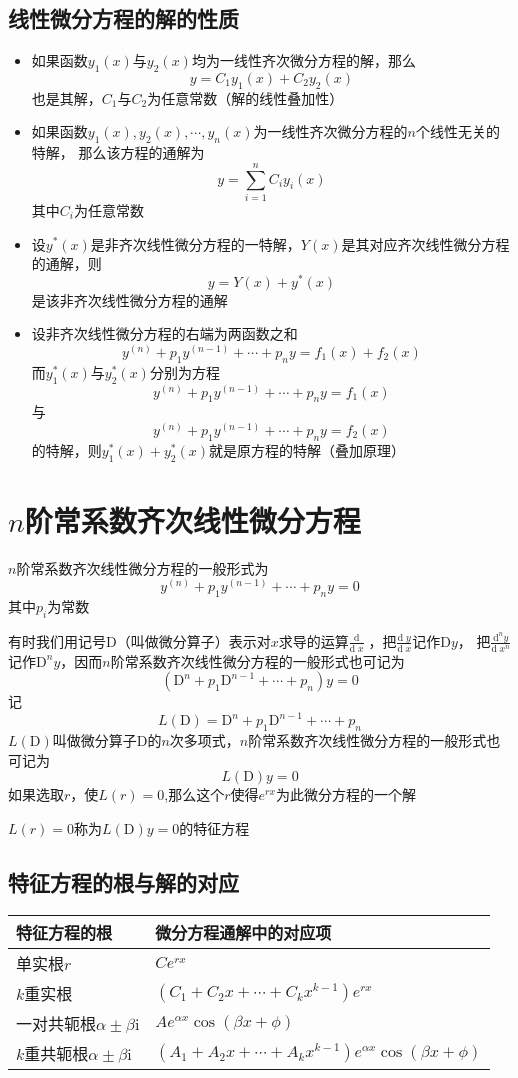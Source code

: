\documentclass[UTF8]{ctexart}
\newcommand{\dif}[1]{\text{d}\;\!#1}
\newcommand{\dev}[1]{\frac{\text{d}}{\dif{#1}}\;\!}
\begin{document}
\subsection*{线性微分方程的解的性质}
\begin{itemize}
  \item 如果函数$y_1(x)$与$y_2(x)$均为一线性齐次微分方程的解，那么
  \[y=C_1y_1(x)+C_2y_2(x)\]
  也是其解，$C_1$与$C_2$为任意常数（解的线性叠加性）

  \item 如果函数$y_1(x),y_2(x),\cdots,y_n(x)$为一线性齐次微分方程的$n$个线性无关的特解，
  那么该方程的通解为
  \[y=\sum^n_{i=1}C_iy_i(x)\]
  其中$C_i$为任意常数

  \item 设$y^*(x)$是非齐次线性微分方程的一特解，$Y(x)$是其对应齐次线性微分方程的通解，则
  \[ y=Y(x)+y^*(x) \]
  是该非齐次线性微分方程的通解

  \item 设非齐次线性微分方程的右端为两函数之和
  \[y^{(n)}+p_1y^{(n-1)}+\cdots+p_ny=f_1(x)+f_2(x)\]
  而$y_1^*(x)$与$y_2^*(x)$分别为方程
  \[ y^{(n)}+p_1y^{(n-1)}+\cdots+p_ny=f_1(x) \]
  与
  \[ y^{(n)}+p_1y^{(n-1)}+\cdots+p_ny=f_2(x) \]
  的特解，则$y_1^*(x)+y_2^*(x)$就是原方程的特解（叠加原理）
\end{itemize}

\bigskip
\bigskip

\section*{$n$阶常系数齐次线性微分方程}

$n$阶常系数齐次线性微分方程的一般形式为
\[y^{(n)}+p_1y^{(n-1)}+\cdots+p_ny=0\]
其中$p_i$为常数

有时我们用记号$\text{D}$（叫做微分算子）表示对$x$求导的运算$\dev{x}$，把$\frac{\dif{y}}{\dif{x}}$记作$\text{D}y$，
把$\frac{\text{d}^ny}{\dif{x}^n}$记作$\text{D}^ny$，因而$n$阶常系数齐次线性微分方程的一般形式也可记为
\[(\text{D}^n+p_1\text{D}^{n-1}+\cdots+p_n)y=0\]
记
\[L(\text{D})=\text{D}^n+p_1\text{D}^{n-1}+\cdots+p_n\]
$L(\text{D})$叫做微分算子$\text{D}$的$n$次多项式，$n$阶常系数齐次线性微分方程的一般形式也可记为
\[L(\text{D})y=0\]
如果选取$r$，使$L(r)=0$,那么这个$r$使得$e^{rx}$为此微分方程的一个解

$L(r)=0$称为$L(\text{D})y=0$的特征方程

\subsection*{特征方程的根与解的对应}
\begin{center}
  \begin{tabular}{ll}
    特征方程的根&微分方程通解中的对应项\\
    \hline
    单实根$r$&$Ce^{rx}$\\
    $k$重实根&$(C_1+C_2x+\cdots+C_kx^{k-1})e^{rx}$\\
    一对共轭根$\alpha\pm\beta\text{i}$&$Ae^{\alpha x}\cos(\beta x+\phi)$\\
    $k$重共轭根$\alpha\pm\beta\text{i}$&$(A_1+A_2x+\cdots+A_kx^{k-1})e^{\alpha x}\cos(\beta x+\phi)$
  \end{tabular}
\end{center}
\end{document}
